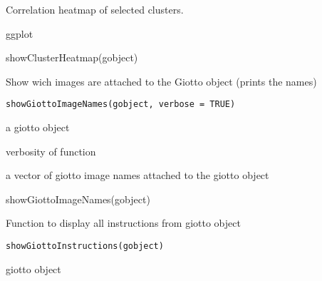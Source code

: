 \documentclass[a4paper]{book}
\begin{document}
%
\begin{Details}\relax
Correlation heatmap of selected clusters.
\end{Details}
%
\begin{Value}
ggplot
\end{Value}
%
\begin{Examples}
\begin{ExampleCode}
    showClusterHeatmap(gobject)
\end{ExampleCode}
\end{Examples}
%
\begin{Description}\relax
Show wich images are attached to the Giotto object (prints the names)
\end{Description}
%
\begin{Usage}
\begin{verbatim}
showGiottoImageNames(gobject, verbose = TRUE)
\end{verbatim}
\end{Usage}
%
\begin{Arguments}
\begin{ldescription}
\item[\code{gobject}] a giotto object

\item[\code{verbose}] verbosity of function
\end{ldescription}
\end{Arguments}
%
\begin{Value}
a vector of giotto image names attached to the giotto object
\end{Value}
%
\begin{Examples}
\begin{ExampleCode}
    showGiottoImageNames(gobject)
\end{ExampleCode}
\end{Examples}
%
\begin{Description}\relax
Function to display all instructions from giotto object
\end{Description}
%
\begin{Usage}
\begin{verbatim}
showGiottoInstructions(gobject)
\end{verbatim}
\end{Usage}
%
\begin{Arguments}
\begin{ldescription}
\item[\code{gobject}] giotto object
\end{ldescription}
\end{Arguments}
\end{document}
